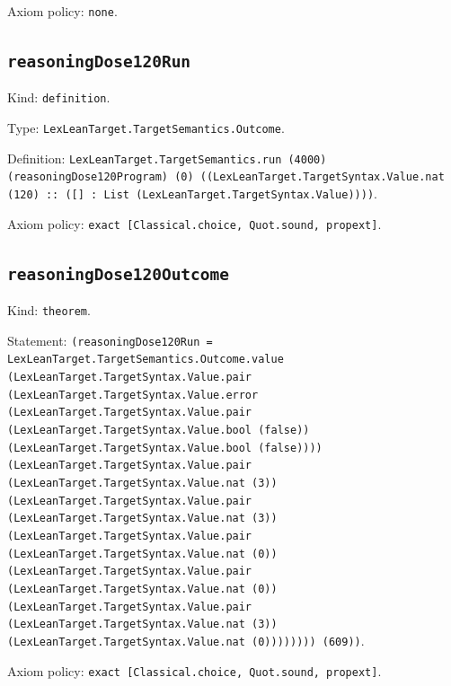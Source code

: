 \documentclass[11pt]{article}
\begin{document}
\noindent Axiom policy: \texttt{none}.\par
\subsection*{\texttt{reasoningDose120Run}}
\noindent Kind: \texttt{definition}.\par
\noindent Type: \texttt{LexLeanTarget.TargetSemantics.Outcome}.\par
\noindent Definition: \texttt{LexLeanTarget.TargetSemantics.run (4000) (reasoningDose120Program) (0) ((LexLeanTarget.TargetSyntax.Value.nat (120) :: ([] : List (LexLeanTarget.TargetSyntax.Value))))}.\par
\noindent Axiom policy: \texttt{exact [Classical.choice, Quot.sound, propext]}.\par
\subsection*{\texttt{reasoningDose120Outcome}}
\noindent Kind: \texttt{theorem}.\par
\noindent Statement: \texttt{(reasoningDose120Run = LexLeanTarget.TargetSemantics.Outcome.value (LexLeanTarget.TargetSyntax.Value.pair (LexLeanTarget.TargetSyntax.Value.error (LexLeanTarget.TargetSyntax.Value.pair (LexLeanTarget.TargetSyntax.Value.bool (false)) (LexLeanTarget.TargetSyntax.Value.bool (false)))) (LexLeanTarget.TargetSyntax.Value.pair (LexLeanTarget.TargetSyntax.Value.nat (3)) (LexLeanTarget.TargetSyntax.Value.pair (LexLeanTarget.TargetSyntax.Value.nat (3)) (LexLeanTarget.TargetSyntax.Value.pair (LexLeanTarget.TargetSyntax.Value.nat (0)) (LexLeanTarget.TargetSyntax.Value.pair (LexLeanTarget.TargetSyntax.Value.nat (0)) (LexLeanTarget.TargetSyntax.Value.pair (LexLeanTarget.TargetSyntax.Value.nat (3)) (LexLeanTarget.TargetSyntax.Value.nat (0)))))))) (609))}.\par
\noindent Axiom policy: \texttt{exact [Classical.choice, Quot.sound, propext]}.\par
\end{document}
